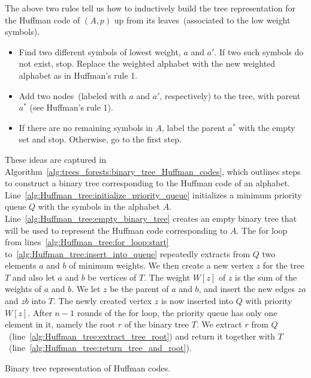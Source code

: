 The above two rules tell us how to inductively build the tree
representation for the Huffman code of $(A,p)$ up from its
leaves~(associated to the low weight symbols).
%
\begin{itemize}
\item Find two different symbols of lowest weight, $a$ and $a'$. If
  two such symbols do not exist, stop. Replace the weighted alphabet
  with the new weighted alphabet as in Huffman's rule 1.

\item Add two nodes~(labeled with $a$ and $a'$, respectively) to the
  tree, with parent $a^*$ (see Huffman's rule 1).

\item If there are no remaining symbols in $A$, label the parent $a^*$
  with the empty set and stop. Otherwise, go to the first step.
\end{itemize}

These ideas are captured in
Algorithm~\ref{alg:trees_forests:binary_tree_Huffman_codes}, which
outlines steps to construct a binary tree corresponding to the Huffman
code of an alphabet.
Line~\ref{alg:Huffman_tree:initialize_priority_queue} initializes a
minimum priority queue $Q$ with the symbols in the alphabet $A$.
Line~\ref{alg:Huffman_tree:empty_binary_tree} creates an empty binary
tree that will be used to represent the Huffman code corresponding to
$A$. The for loop from lines~\ref{alg:Huffman_tree:for_loop:start}
to~\ref{alg:Huffman_tree:insert_into_queue} repeatedly extracts from
$Q$ two elements $a$ and $b$ of minimum weights. We then create a new
vertex $z$ for the tree $T$ and also let $a$ and $b$ be vertices of
$T$. The weight $W[z]$ of $z$ is the sum of the weights of $a$ and
$b$. We let $z$ be the parent of $a$ and $b$, and insert the new edges
$za$ and $zb$ into $T$. The newly created vertex $z$ is now inserted
into $Q$ with priority $W[z]$. After $n - 1$ rounds of the for loop,
the priority queue has only one element in it, namely the root $r$ of
the binary tree $T$. We extract $r$ from
$Q$~(line~\ref{alg:Huffman_tree:extract_tree_root}) and return it
together with $T$~(line~\ref{alg:Huffman_tree:return_tree_and_root}).

\begin{algorithm}[!htpb]

\caption{Binary tree representation of Huffman codes.}
\label{alg:trees_forests:binary_tree_Huffman_codes}
\end{algorithm}

